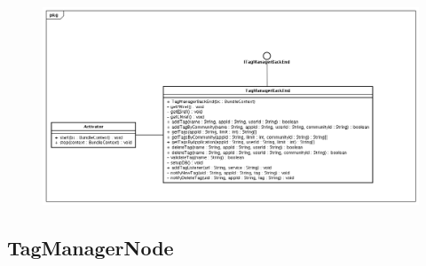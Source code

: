 \begin{frame}
	    
	\begin{figure}
	 	\includegraphics[scale=0.3]{img/TagManagerBackEndClassDiagram.png}
	\end{figure}

\end{frame}

\subsection{TagManagerNode}

